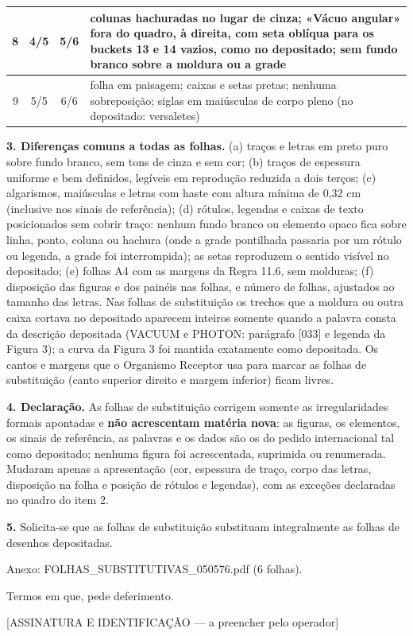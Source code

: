 \documentclass[a4paper,11pt]{article}
\begin{document}
{\begin{longtable}{|r|c|c|p{9.4cm}|}
8 & 4/5 & 5/6 & colunas hachuradas no lugar de cinza; «Vácuo angular» fora do quadro, à direita, com seta oblíqua para os buckets 13 e 14 vazios, como no depositado; sem fundo branco sobre a moldura ou a grade\\\hline

9 & 5/5 & 6/6 & folha em paisagem; caixas e setas pretas; nenhuma sobreposição; siglas em maiúsculas de corpo pleno (no depositado: versaletes)\\\hline

\end{longtable}}

\textbf{3. Diferenças comuns a todas as folhas.} (a) traços e letras em preto puro sobre fundo branco, sem tons de cinza e sem cor; (b) traços de espessura uniforme e bem definidos, legíveis em reprodução reduzida a dois terços; (c) algarismos, maiúsculas e letras com haste com altura mínima de 0,32 cm (inclusive nos sinais de referência); (d) rótulos, legendas e caixas de texto posicionados sem cobrir traço: nenhum fundo branco ou elemento opaco fica sobre linha, ponto, coluna ou hachura (onde a grade pontilhada passaria por um rótulo ou legenda, a grade foi interrompida); as setas reproduzem o sentido visível no depositado; (e) folhas A4 com as margens da Regra 11.6, sem molduras; (f) disposição das figuras e dos painéis nas folhas, e número de folhas, ajustados ao tamanho das letras. Nas folhas de substituição os trechos que a moldura ou outra caixa cortava no depositado aparecem inteiros somente quando a palavra consta da descrição depositada (VACUUM e PHOTON: parágrafo [033] e legenda da Figura 3); a curva da Figura 3 foi mantida exatamente como depositada. Os cantos e margens que o Organismo Receptor usa para marcar as folhas de substituição (canto superior direito e margem inferior) ficam livres.

\textbf{4. Declaração.} As folhas de substituição corrigem somente as irregularidades formais apontadas e \textbf{não acrescentam matéria nova}: as figuras, os elementos, os sinais de referência, as palavras e os dados são os do pedido internacional tal como depositado; nenhuma figura foi acrescentada, suprimida ou renumerada. Mudaram apenas a apresentação (cor, espessura de traço, corpo das letras, disposição na folha e posição de rótulos e legendas), com as exceções declaradas no quadro do item 2.

\textbf{5.} Solicita-se que as folhas de substituição substituam integralmente as folhas de desenhos depositadas.

Anexo: FOLHAS\_SUBSTITUTIVAS\_050576.pdf (6 folhas).

Termos em que, pede deferimento.

\vspace{1.2cm}[ASSINATURA E IDENTIFICAÇÃO --- a preencher pelo operador]
\end{document}

